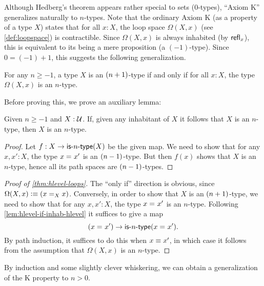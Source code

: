 %

%
Although Hedberg's theorem appears rather special to sets ($0$-types), ``Axiom K'' generalizes naturally to $n$-types.
Note that the ordinary Axiom K (as a property of a type $X$) states that for all $x:X$, the loop space $\Omega(X,x)$ (see \cref{def:loopspace}) is contractible.
Since $\Omega(X,x)$ is always inhabited (by $\refl{x}$), this is equivalent to its being a mere proposition (a $(-1)$-type).
Since $0 = (-1)+1$, this suggests the following generalization.

\begin{thm}\label{thm:hlevel-loops}
  For any $n\geq -1$, a type $X$ is an $\nplusone$-type if and only if for all $x : X$, the type $\Omega(X, x)$ is an $n$-type.
\end{thm}

Before proving this, we prove an auxiliary lemma:

\begin{lem}\label{lem:hlevel-if-inhab-hlevel}
  Given $n \geq -1$ and $X : \type$.
  If, given any inhabitant of $X$ it follows that $X$ is an $n$-type, then $X$ is an $n$-type.
\end{lem}
\begin{proof}
  Let $f : X \to \istype{n}(X)$ be the given map.
  We need to show that for any $x, x' : X$, the type $\id{x}{x'}$ is an $\nminusone$-type.
  But then $f(x)$ shows that $X$ is an $n$-type, hence all its path spaces are $\nminusone$-types.
\end{proof}

\begin{proof}[Proof of \cref{thm:hlevel-loops}]
  The ``only if'' direction is obvious, since $\Omega(X,x)\defeq (\id[X]xx)$.
  Conversely, in order to show that $X$ is an $\nplusone$-type, we need to show that for any $x, x' : X$, the type $\id{x}{x'}$ is an
$n$-type.
  Following \cref{lem:hlevel-if-inhab-hlevel} it suffices to give a map
  \[ (\id{x}{x'}) \to \istype{n}(\id{x}{x'}). \]
  By path induction, it suffices to do this when $x\jdeq x'$, in which case it follows from the assumption that $\Omega(X, x)$ is an
$n$-type.
\end{proof}

By induction and some slightly clever whiskering, we can obtain a generalization of the K property to $n>0$.

